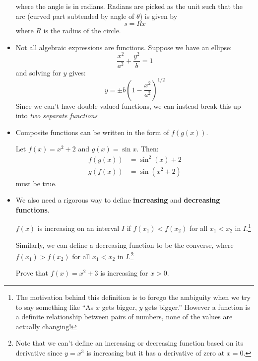 \begin{itemize}
\begin{center}
    \end{center}
    where the angle is in radians. Radians are picked as the unit such that the arc (curved part subtended by angle of $\theta$) is given by
    \begin{equation}
        s = Rx
        \label{eq:}
    \end{equation}
    where $R$ is the radius of the circle.
    \item Not all algebraic expressions are functions. Suppose we have an ellipse:
    \begin{equation}
        \frac{x^2}{a^2}+\frac{y^2}{b}=1
        \label{eq:}
    \end{equation}
    and solving for $y$ gives:
    \begin{equation}
        y = \pm b\left(1-\frac{x^2}{a^2}\right)^{1/2}
        \label{eq:}
    \end{equation}
    Since we can't have double valued functions, we can instead break this up into \emph{two separate functions}
    \item Composite functions can be written in the form of $f(g(x))$.
    \begin{example}
        Let $f(x)=x^2+2$ and $g(x)=\sin x$. Then:
        \begin{align}
            f(g(x))&=\sin^2(x)+2 \\
            g(f(x))&=\sin(x^2+2)
        \end{align}
        must be true.
    \end{example}
    \item We also need a rigorous way to define \textbf{increasing} and \textbf{decreasing functions}.
    \begin{definition}
        $f(x)$ is increasing on an interval $I$ if $f(x_1)<f(x_2)$ for all $x_1<x_2$ in $I$.\footnote{The motivation behind this definition is to forego the ambiguity when we try to say something like ``As $x$ gets bigger, $y$ gets bigger.'' However a function is a definite relationship between pairs of numbers, none of the values are actually changing! }
    \end{definition}
    Similarly, we can define a decreasing function to be the converse, where $f(x_1)>f(x_2)$ for all $x_1<x_2$ in $I$.\footnote{Note that we can't define an increasing or decreasing function based on its derivative since $y=x^3$ is increasing but it has a derivative of zero at $x=0$.}
    \begin{example}
        Prove that $f(x)=x^2+3$ is increasing for $x>0$.
        \vspace{2mm}


\end{example}
\end{itemize}
